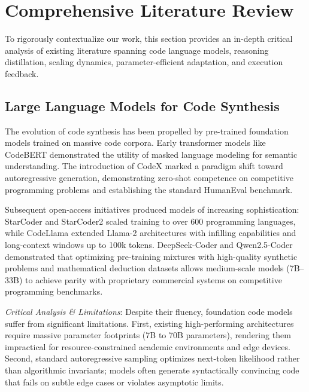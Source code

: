 \documentclass{ieeeaccess}
\begin{document}
\section{Comprehensive Literature Review}
\label{sec:lit_review}
To rigorously contextualize our work, this section provides an in-depth critical analysis of existing literature spanning code language models, reasoning distillation, scaling dynamics, parameter-efficient adaptation, and execution feedback.

\subsection{Large Language Models for Code Synthesis}
The evolution of code synthesis has been propelled by pre-trained foundation models trained on massive code corpora. Early transformer models like CodeBERT \cite{feng2020codebert} demonstrated the utility of masked language modeling for semantic understanding. The introduction of CodeX \cite{chen2021humaneval} marked a paradigm shift toward autoregressive generation, demonstrating zero-shot competence on competitive programming problems and establishing the standard HumanEval benchmark.

Subsequent open-access initiatives produced models of increasing sophistication: StarCoder \cite{li2023starcoder} and StarCoder2 scaled training to over 600 programming languages, while CodeLlama \cite{roziere2023codellama} extended Llama-2 architectures with infilling capabilities and long-context windows up to 100k tokens. DeepSeek-Coder \cite{guo2024deepseekcoder} and Qwen2.5-Coder \cite{qwen2024coder} demonstrated that optimizing pre-training mixtures with high-quality synthetic problems and mathematical deduction datasets allows medium-scale models (7B--33B) to achieve parity with proprietary commercial systems on competitive programming benchmarks.

\textit{Critical Analysis \& Limitations}: Despite their fluency, foundation code models suffer from significant limitations. First, existing high-performing architectures require massive parameter footprints (7B to 70B parameters), rendering them impractical for resource-constrained academic environments and edge devices. Second, standard autoregressive sampling optimizes next-token likelihood rather than algorithmic invariants; models often generate syntactically convincing code that fails on subtle edge cases or violates asymptotic limits.
\end{document}
